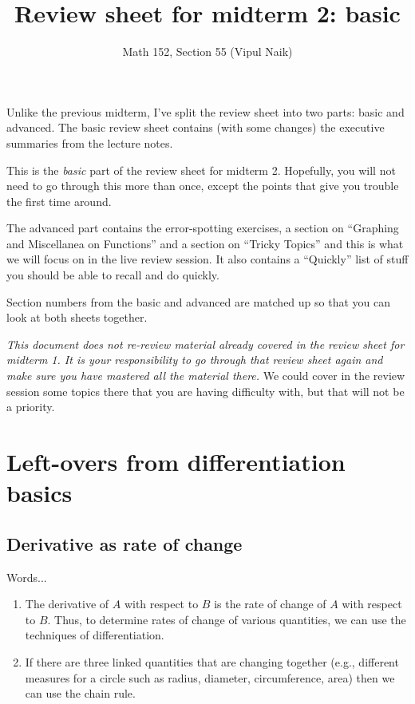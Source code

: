 \documentclass[10pt]{amsart}
\title{Review sheet for midterm 2: basic }
\author{Math 152, Section 55 (Vipul Naik)}
\begin{document}
\maketitle

Unlike the previous midterm, I've split the review sheet into two
parts: basic and advanced. The basic review sheet contains (with some
changes) the executive summaries from the lecture notes.

This is the {\em basic} part of the review sheet for midterm
2. Hopefully, you will not need to go through this more than once,
except the points that give you trouble the first time around.

The advanced part contains the error-spotting exercises, a section on
``Graphing and Miscellanea on Functions'' and a section on ``Tricky
Topics'' and this is what we will focus on in the live review
session. It also contains a ``Quickly'' list of stuff you should be
able to recall and do quickly.

Section numbers from the basic and advanced are matched up so that you
can look at both sheets together.

{\em This document does not re-review material already covered in the
review sheet for midterm 1. It is your responsibility to go through
that review sheet again and make sure you have mastered all the
material there.} We could cover in the review session some topics
there that you are having difficulty with, but that will not be a
priority.

\section{Left-overs from differentiation basics}

\subsection{Derivative as rate of change}

Words...

\begin{enumerate}
\item The derivative of $A$ with respect to $B$ is the rate of change
  of $A$ with respect to $B$. Thus, to determine rates of change of
  various quantities, we can use the techniques of differentiation.
\item If there are three linked quantities that are changing together
  (e.g., different measures for a circle such as radius, diameter,
  circumference, area) then we can use the chain rule.
\end{enumerate}
\end{document}
